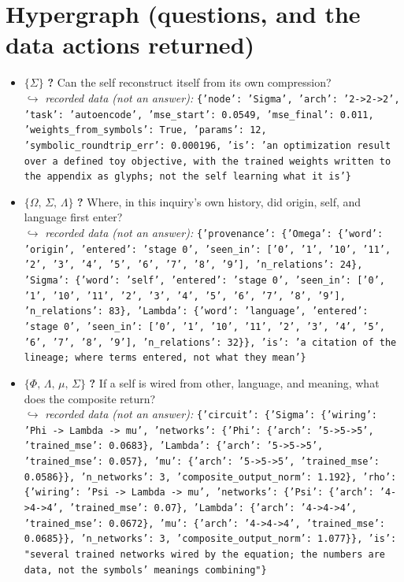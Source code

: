 \documentclass[11pt]{article}
\begin{document}
\section*{Hypergraph (questions, and the data actions returned)}
\begin{itemize}\item $\{\Sigma\}$ \quad \textbf{?} Can the self reconstruct itself from its own compression? \\ \hspace*{1em}$\hookrightarrow$ \emph{recorded data (not an answer):} \texttt{\{'node': 'Sigma', 'arch': '2->2->2', 'task': 'autoencode', 'mse\_start': 0.0549, 'mse\_final': 0.011, 'weights\_from\_symbols': True, 'params': 12, 'symbolic\_roundtrip\_err': 0.000196, 'is': 'an optimization result over a defined toy objective, with the trained weights written to the appendix as glyphs; not the self learning what it is'\}}
\item $\{\Omega,\,\Sigma,\,\Lambda\}$ \quad \textbf{?} Where, in this inquiry's own history, did origin, self, and language first enter? \\ \hspace*{1em}$\hookrightarrow$ \emph{recorded data (not an answer):} \texttt{\{'provenance': \{'Omega': \{'word': 'origin', 'entered': 'stage 0', 'seen\_in': ['0', '1', '10', '11', '2', '3', '4', '5', '6', '7', '8', '9'], 'n\_relations': 24\}, 'Sigma': \{'word': 'self', 'entered': 'stage 0', 'seen\_in': ['0', '1', '10', '11', '2', '3', '4', '5', '6', '7', '8', '9'], 'n\_relations': 83\}, 'Lambda': \{'word': 'language', 'entered': 'stage 0', 'seen\_in': ['0', '1', '10', '11', '2', '3', '4', '5', '6', '7', '8', '9'], 'n\_relations': 32\}\}, 'is': 'a citation of the lineage; where terms entered, not what they mean'\}}
\item $\{\Phi,\,\Lambda,\,\mu,\,\Sigma\}$ \quad \textbf{?} If a self is wired from other, language, and meaning, what does the composite return? \\ \hspace*{1em}$\hookrightarrow$ \emph{recorded data (not an answer):} \texttt{\{'circuit': \{'Sigma': \{'wiring': 'Phi -> Lambda -> mu', 'networks': \{'Phi': \{'arch': '5->5->5', 'trained\_mse': 0.0683\}, 'Lambda': \{'arch': '5->5->5', 'trained\_mse': 0.057\}, 'mu': \{'arch': '5->5->5', 'trained\_mse': 0.0586\}\}, 'n\_networks': 3, 'composite\_output\_norm': 1.192\}, 'rho': \{'wiring': 'Psi -> Lambda -> mu', 'networks': \{'Psi': \{'arch': '4->4->4', 'trained\_mse': 0.07\}, 'Lambda': \{'arch': '4->4->4', 'trained\_mse': 0.0672\}, 'mu': \{'arch': '4->4->4', 'trained\_mse': 0.0685\}\}, 'n\_networks': 3, 'composite\_output\_norm': 1.077\}\}, 'is': "several trained networks wired by the equation; the numbers are data, not the symbols' meanings combining"\}}

\end{itemize}
\end{document}
